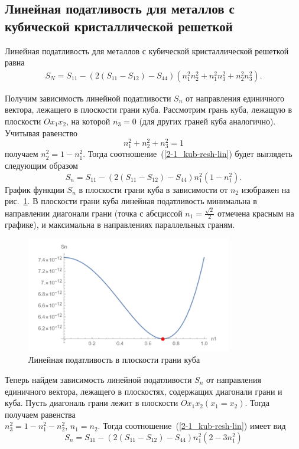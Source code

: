 \documentclass[12pt, a4paper]{article}
\begin{document}
\subsection{Линейная податливость для металлов с кубической кристаллической решеткой}

Линейная податливость для металлов с кубической кристаллической решеткой
равна 
\begin{gather} 
	\label{2-1_kub-resh-lin}
	S_N = S_{11} - \left( 2 \left(S_{11} - S_{12}\right) - S_{44} \right) (n_1^2 n_2^2 + n_1^2 n_3^2 + n_2^2 n_3^2).
\end{gather}

Получим зависимость линейной податливости $S_n$ от направления единичного вектора, лежащего в плоскости грани куба. Рассмотрим грань куба, лежащую в плоскости $O x_1 x_2$, на которой $n_3 = 0$ (для других граней куба аналогично). Учитывая равенство
\[
n_1^2 + n_2^2 + n_3^2 = 1
\]
получаем $n_2^2 = 1 - n_1^2$. Тогда соотношение~(\ref{2-1_kub-resh-lin}) будет выглядеть следующим образом
\[
S_n = S_{11} - \left( 2 \left(S_{11} - S_{12}\right) - S_{44} \right) n_1^2 \left(1 - n_1^2\right).
\]
График функции $S_n$ в плоскости грани куба в зависимости от $n_2$ изображен
на рис.~\ref{lin-pod-kube}. В плоскости грани куба линейная податливость минимальна в направлении диагонали грани (точка с абсциссой $n_1 = \frac{\sqrt{2}}{2}$ отмечена красным на графике), и
максимальна в направлениях параллельных граням.
\begin{figure}[!htbp]
	\centering
	\includegraphics[width=0.8\textwidth]{pic-1}%
	\caption{Линейная податливость в плоскости грани куба}
	\vspace*{-2mm}
	\label{lin-pod-kube}
\end{figure}

Теперь найдем зависимость линейной податливости $S_n$ от направления единичного вектора, лежащего в плоскостях, содержащих диагонали грани и куба. Пусть
диагональ грани лежит в плоскости $Ox_1x_2 \left(x_1 = x_2 \right)$.
Тогда получаем равенства\\
$n_{3}^{2} = 1 - n_{1}^{2} - n^2_2$,
$n_1 = n_2$. Тогда соотношение~(\ref{2-1_kub-resh-lin}) имеет вид
\[
S_n = S_{11} - \left( 2 \left(S_{11} - S_{12}\right) - S_{44} \right) n_1^2 \left(2 - 3 n_1^2\right)
\]
\end{document}
